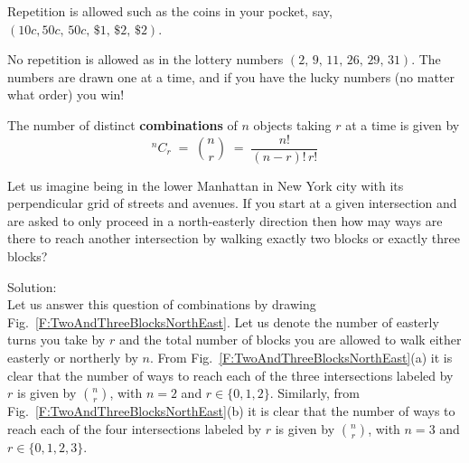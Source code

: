 \be
\item Repetition is allowed  such as the  coins in your pocket, say, $(10c, 50c,\, 50c, \, \$1,\, \$2, \,\$2)$.
\item  No repetition is allowed as  in the  lottery numbers $(2,\,9,\,11,\,26,\,29,\,31)$.  The numbers are drawn one at a time, 
and if you have the lucky numbers (no matter what order) you win!
\ee

\begin{framed}The number of distinct {\bf combinations}  of $n$ objects taking
$r$ at a time is given by
\[^nC_r\;=\;\binom{n}{r} \;=\; \frac{n!}{(n-r)!\,r!}\]
\end{framed}

\begin{example}
Let us imagine being in the lower Manhattan in New York city with its perpendicular grid of streets and avenues.  
If you start at a given intersection and are asked to only proceed in a north-easterly direction then how may ways are there 
to reach another intersection by walking exactly two blocks or exactly three blocks?

Solution:\\
Let us answer this question of combinations by drawing Fig.~\ref{F:TwoAndThreeBlocksNorthEast}.
Let us denote the number of easterly turns you take by $r$ and the total number of blocks you are allowed to walk either easterly or northerly by $n$.  
From Fig.~\ref{F:TwoAndThreeBlocksNorthEast}(a) it is clear that the number of ways to reach each of the three intersections labeled by $r$ is given by $\binom{n}{r}$, 
with $n=2$ and $r \in \{0,1,2\}$. 
Similarly, from Fig.~\ref{F:TwoAndThreeBlocksNorthEast}(b) it is clear that the number of ways to reach each of the four intersections labeled by $r$ is given by $\binom{n}{r}$, with $n=3$ and $r \in \{0,1,2,3\}$.
\end{example}
  
